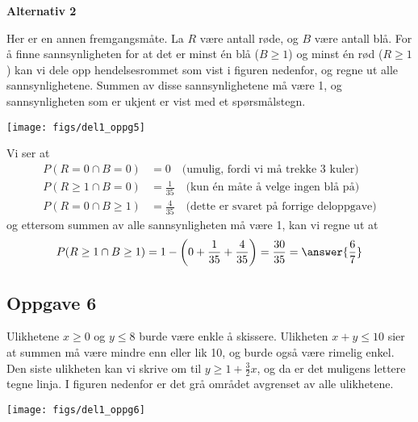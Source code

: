 \begin{easylist}[enumerate]
	\textbf{Alternativ 2}
	
	Her er en annen fremgangsmåte.
	La $R$ være antall røde, og $B$ være antall blå.
	For å finne sannsynligheten for at det er minst én blå ($B \geq 1$) og minst én rød ($R \geq 1$) kan vi dele opp hendelsesrommet som vist i figuren nedenfor, og regne ut alle sannsynlighetene. Summen av disse sannsynlighetene må være 1, og sannsynligheten som er ukjent er vist med et spørsmålstegn.
	\begin{center}
		\texttt{[image: figs/del1\_oppg5]}
	\end{center}
	Vi ser at
	\begin{align*}
		P(R = 0 \cap B = 0) &= 0  \quad \text{(umulig, fordi vi må trekke 3 kuler)}\\
		P(R \geq 1 \cap B = 0) &= \frac{1}{35} \quad \text{(kun én måte å velge ingen blå på)}\\
		P(R = 0 \cap B \geq 1) &= \frac{4}{35} \quad \text{(dette er svaret på forrige deloppgave)}
	\end{align*}
	og ettersom summen av alle sannsynligheten må være 1, kan vi regne ut at
	\begin{equation*}
		P(R \geq 1 \cap B \geq 1) = 1 -
		\left( 0 + 
		\frac{1}{35} + 
		\frac{4}{35}\right) = \frac{30}{35} = \answer{\frac{6}{7}}
	\end{equation*}
\end{easylist}

\subsection*{Oppgave 6}
Ulikhetene $x \geq 0$ og $y \leq 8$ burde være enkle å skissere.
Ulikheten $x + y \leq 10$ sier at summen må være mindre enn eller lik 10, og burde også være rimelig enkel. Den siste ulikheten kan vi skrive om til $y \geq 1 + \frac{3}{2}x$, og da er det muligens lettere tegne linja.
I figuren nedenfor er det grå området avgrenset av alle ulikhetene.

\begin{center}
	\texttt{[image: figs/del1\_oppg6]}
\end{center}


